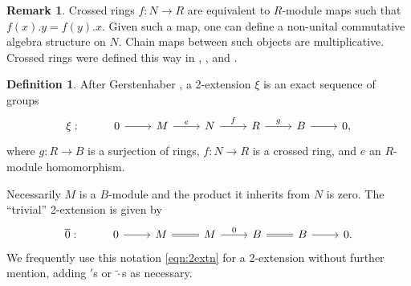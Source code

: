 \documentclass[11pt,reqno]{amsart}
\theoremstyle{definition}
\newtheorem{definition}[theorem]{Definition}
\newtheorem{remark}[theorem]{Remark}
\renewcommand{\tilde}[1]{\ensuremath{\widetilde{#1}}}
\begin{document}
\begin{remark}

Crossed rings $f : N \to R$ are equivalent to $R$-module maps such that $f(x).y = f(y).x$. Given such a map, one can define a non-unital commutative algebra structure on $N$. Chain maps between such objects are multiplicative. Crossed rings were defined this way in \cite[Definition 2.1.1]{lichtenbaumschlessinger}, \cite[Definition 2.1.1]{aldrovandianncats}, and \cite[3.3.1]{ringgroupoiddrinfeld}. 

\end{remark}


\begin{definition}

After Gerstenhaber \cite[pg. 4]{gerstenhaber2}, a 2-extension $\xi$ is an exact sequence of groups
\begin{equation}\label{eqn:2extn}
\begin{tikzcd}
\xi:     &0 \ar[r]   &M \ar[r, "e"]      &N \ar[r, "f"]      &R \ar[r, "g"]      &B \arrow[r]      &0,
\end{tikzcd}
\end{equation}
where $g : R \to B$ is a surjection of rings, $f : N \to R$ is a crossed ring, and $e$ an $R$-module homomorphism. 

\end{definition}

Necessarily $M$ is a $B$-module and the product it inherits from $N$ is zero. The ``trivial'' 2-extension is given by
\begin{equation}\label{eqn:trivial2extn}
\begin{tikzcd}
\overline{0}: &0 \ar[r] &M \ar[r, equals] &M \ar[r, "0"] &B \ar[r, equals] &B \ar[r] &0.
\end{tikzcd}    
\end{equation}
We frequently use this notation \eqref{eqn:2extn} for a 2-extension without further mention, adding $'$s or $\tilde{\cdot}$s as necessary. 
\end{document}
